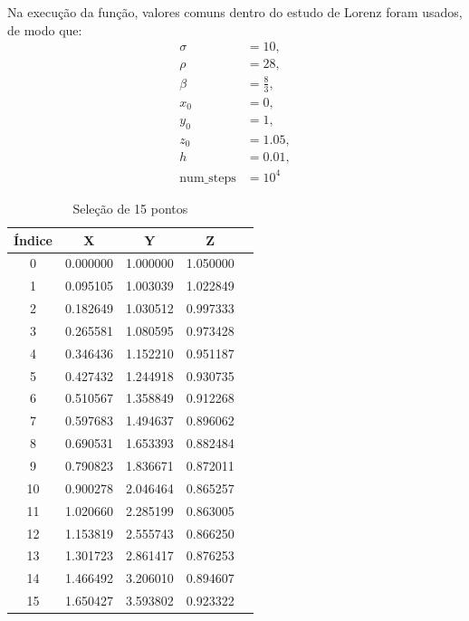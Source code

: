 \documentclass[12pt, a4paper]{article}
\begin{document}
Na execução da função, valores comuns dentro do estudo de Lorenz foram
usados, de modo que:
\begin{equation}
    \begin{aligned}
        \sigma            & = 10,          \\
        \rho              & = 28,          \\
        \beta             & = \frac{8}{3}, \\
        x_0               & = 0,           \\
        y_0               & = 1,           \\
        z_0               & = 1.05,        \\
        h                 & = 0.01,        \\
        \text{num\_steps} & = 10^4
    \end{aligned}
\end{equation}

\begin{table}[H]
    \centering
    \begin{tabular}{|c|c|c|c|c|}
        \hline
        Índice & X        & Y        & Z        \\
        \hline
        0      & 0.000000 & 1.000000 & 1.050000 \\
        1      & 0.095105 & 1.003039 & 1.022849 \\
        2      & 0.182649 & 1.030512 & 0.997333 \\
        3      & 0.265581 & 1.080595 & 0.973428 \\
        4      & 0.346436 & 1.152210 & 0.951187 \\
        5      & 0.427432 & 1.244918 & 0.930735 \\
        6      & 0.510567 & 1.358849 & 0.912268 \\
        7      & 0.597683 & 1.494637 & 0.896062 \\
        8      & 0.690531 & 1.653393 & 0.882484 \\
        9      & 0.790823 & 1.836671 & 0.872011 \\
        10     & 0.900278 & 2.046464 & 0.865257 \\
        11     & 1.020660 & 2.285199 & 0.863005 \\
        12     & 1.153819 & 2.555743 & 0.866250 \\
        13     & 1.301723 & 2.861417 & 0.876253 \\
        14     & 1.466492 & 3.206010 & 0.894607 \\
        15     & 1.650427 & 3.593802 & 0.923322 \\
        \hline
    \end{tabular}
    \caption{Seleção de 15 pontos}
\end{table}
\end{document}
